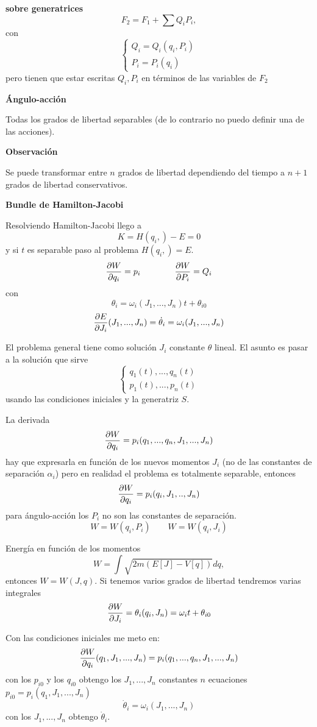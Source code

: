 \documentclass[10pt,oneside]{CBFT_book}
\begin{document}
{\bf sobre generatrices}
\[
	F_2 = F_1 + \sum  Q_i P_i,
\]
con
\[
	\begin{cases}
	Q_i = Q_i( q_i, P_i ) \\
	P_i = P_i( q_i )
	\end{cases}
\]
pero tienen que estar escritas $Q_i, P_i$ en términos de las variables de $F_2$

{\bf Ángulo-acción}

Todas los grados de libertad separables (de lo contrario no puedo definir una de las acciones).

{\bf Observación}

Se puede transformar entre $n$ grados de libertad dependiendo del tiempo a $n+1$ grados de 
libertad conservativos.

{\bf Bundle de Hamilton-Jacobi}

Resolviendo Hamilton-Jacobi llego a
\[
	K = H(q_i,) - E = 0
\]
y si $t$ es separable paso al problema $ H(q_i,) = E $.
\[
	\frac{\partial^{\hspace{-0.05em}} {W}}{\partial {q_i}^{\hspace{-0.05em}}} = p_i \qquad \qquad \frac{\partial^{\hspace{-0.05em}} {W}}{\partial {P_i}^{\hspace{-0.05em}}} = Q_i
\]
con 
\[
	\theta_i = \omega_i(J_1,...,J_n) t + \theta_{i0}
\]
\[
	\frac{\partial^{\hspace{-0.05em}} {E}}{\partial {J_i}^{\hspace{-0.05em}}}(J_1,...,J_n) = \dot{\theta}_i = \omega_i (J_1,...,J_n)
\]

El problema general tiene como solución $J_i$ constante $\theta$ lineal.
El asunto es pasar a la solución que sirve 
\[
	\begin{cases}
	q_1(t), ..., q_n(t) \\
	p_1(t), ..., p_n(t)
	\end{cases}
\]
usando las condiciones iniciales y la generatriz $S$.

La derivada
\[
	\frac{\partial^{\hspace{-0.05em}} {W}}{\partial {q_i}^{\hspace{-0.05em}}} = p_i(q_1,... , q_n,J_1,...,J_n)
\]
hay que expresarla en función de los nuevos momentos $J_i$ (no de las constantes de separación $\alpha_i$) pero
en realidad el problema es totalmente separable, entonces
\[
	\frac{\partial^{\hspace{-0.05em}} {W}}{\partial {q_i}^{\hspace{-0.05em}}} = p_i(q_i,J_1,..,J_n)
\]
para ángulo-acción los $P_i$ no son las constantes de separación.
\[
	W = W(q_i,P_i) \qquad W = W(q_i,J_i)
\]

Energía en función de los momentos
\[
	W = \int \sqrt{ 2 m ( E[J] - V[q] ) } dq, 
\]
entonces $W = W( J, q )$. Si tenemos varios grados de libertad tendremos varias integrales
\[
	\frac{\partial^{\hspace{-0.05em}} {W}}{\partial {J_i}^{\hspace{-0.05em}}} = \theta_i(q_i,J_n) = \omega_i t + \theta_{i0}
\]

Con las condiciones iniciales me meto en:
\[
	\frac{\partial^{\hspace{-0.05em}} {W}}{\partial {q_i}^{\hspace{-0.05em}}}(q_1,J_1,...,J_n) = p_i(q_1,... , q_n,J_1,...,J_n)
\]
con los $p_{i0}$ y los $q_{i0}$ obtengo los $J_1, ..., J_n$ constantes $n$ ecuaciones $p_{i0} = p_i (q_1,J_1,...,J_n)$
\[
	\dot{\theta}_i = \omega_i (J_1, ..., J_n )
\]
con los $J_1, ..., J_n$ obtengo $\dot{\theta}_i$.

\end{document}
